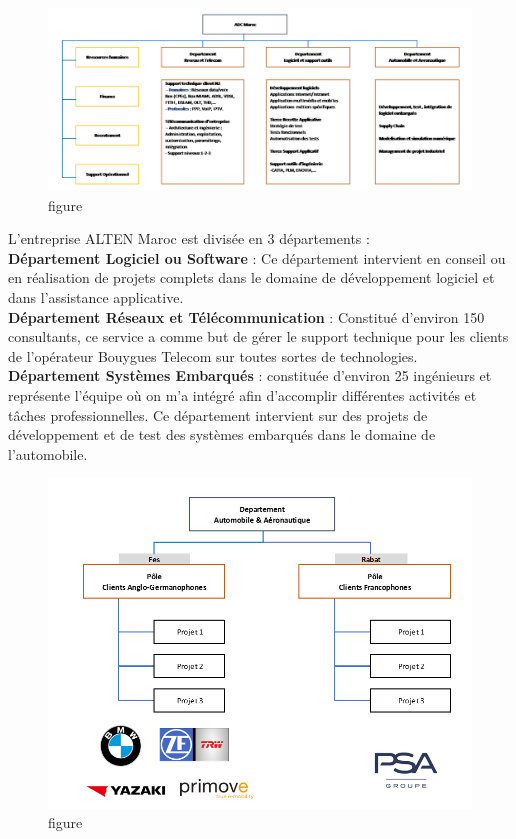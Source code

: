 \begin{figure} [H]
\centering
\includegraphics[scale=0.3]{images/organisme}
\caption{figure}
\end{figure}
L’entreprise ALTEN Maroc est divisée en 3 départements :\\
\textbf{Département Logiciel ou Software} : Ce département intervient en conseil ou en réalisation de projets complets dans le domaine de développement logiciel et dans l’assistance applicative.\\
\textbf{Département Réseaux et Télécommunication} : Constitué d’environ 150 consultants, ce service a comme but de gérer le support technique pour les clients de l’opérateur Bouygues Telecom sur toutes sortes de technologies.\\
\textbf{Département Systèmes Embarqués} : constituée d’environ 25 ingénieurs et représente l’équipe où on m’a intégré afin d’accomplir différentes activités et tâches professionnelles. Ce département intervient sur des projets de développement et de test des systèmes embarqués dans le domaine de l’automobile.\\
\begin{figure} [H]
\centering
\includegraphics[scale=0.3]{images/departement}
\caption{figure}
\end{figure}
